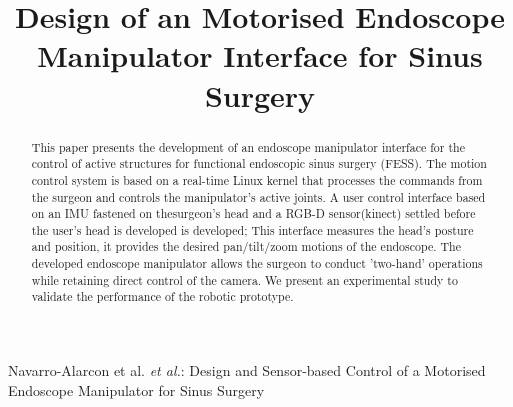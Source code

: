 \documentclass[journal,twoside]{IEEEtran}
\theoremstyle{definition}
\begin{document}
\title{Design of an Motorised Endoscope Manipulator Interface for Sinus Surgery}

\author{
}

%
{Navarro-Alarcon et al. \MakeLowercase{\textit{et al.}}: Design and Sensor-based Control of a Motorised Endoscope Manipulator for Sinus Surgery}
\maketitle


\begin{abstract}
This paper presents the development of an endoscope manipulator interface for the control of active structures for functional endoscopic sinus surgery (FESS).
The motion control system is based on a real-time Linux kernel that processes the commands from the surgeon and controls the manipulator’s active joints.
A user control interface based on an IMU fastened on thesurgeon’s head and a RGB-D sensor(kinect) settled before the user's head is developed is developed; This interface measures the head's posture and position, it provides the desired pan/tilt/zoom motions of the endoscope. 
The developed endoscope manipulator allows the surgeon to conduct ’two-hand’ operations while retaining direct control of the camera.
We present an experimental study to validate the performance of the robotic prototype.

\end{abstract}
\end{document}
